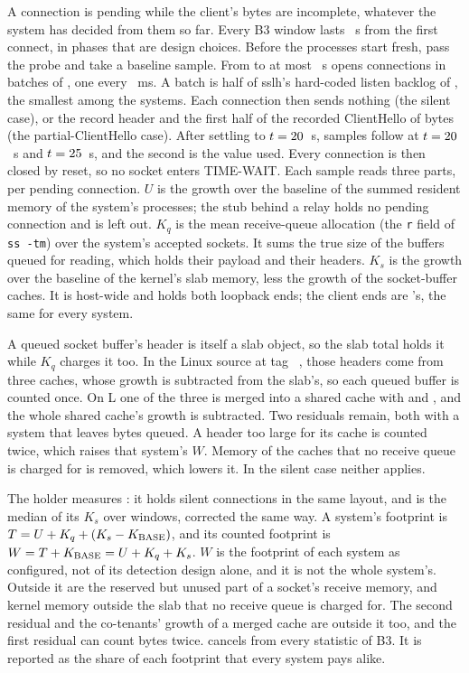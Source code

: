 A connection is pending while the client's bytes are incomplete, whatever the system has decided
from them so far. Every B3 window lasts \PendWindowS{}~s from the first connect, in phases that
are design choices. Before \Tzero{} the processes start fresh, pass the probe and take a baseline
sample. From \Tzero{} to at most \PendOpenS{}~s \opcase{} opens \NPend{} connections in batches
of \PendBatch, one every \PendBatchMs{}~ms. A batch is half of sslh's hard-coded listen backlog of
\SslhBacklog, the smallest among the systems. Each connection then sends nothing (the silent case),
or the record header and the first half of the recorded ClientHello of \HelloLen{} bytes (the
partial-ClientHello case). After settling to $t = 20$~s, samples follow at $t =
20$~s and $t = 25$~s, and the second is the value used. Every connection is then
closed by reset, so no socket enters TIME-WAIT.
Each sample reads three parts, per pending connection. $U$ is the growth over the baseline of the
summed resident memory of the system's processes; the stub behind a relay holds no pending
connection and is left out. $K_q$ is the mean receive-queue allocation (the \texttt{r} field of
\texttt{ss -tm}) over the system's accepted sockets. It sums the true size of the buffers queued
for reading, which holds their payload and their headers. $K_s$ is the growth over the baseline
of the kernel's slab memory, less the growth of the socket-buffer caches. It is host-wide and
holds both loopback ends; the client ends are \opcase's, the same for every system.

A queued socket buffer's header is itself a slab object, so the slab total holds it while $K_q$
charges it too. In the Linux source at tag \KernelTag~\cite{linux2026v72}, those headers come from
three caches, whose growth is subtracted from the slab's, so each queued buffer is counted once. On
L one of the three is merged into a shared cache with  and \SgPool, and the
whole shared cache's growth is subtracted. Two residuals remain, both with a system that leaves
bytes queued. A header too large for its cache is counted twice, which raises that system's $W$.
Memory of the caches that no receive queue is charged for is removed, which lowers it. In the
silent case neither applies.

The holder \ophold{} measures \Kbase: it holds \NPend{} silent connections in the same layout, and
\Kbase{} is the median of its $K_s$ over \KBaseWindows{} windows, corrected the same way. A
system's footprint is $T = U + K_q + (K_s - K_{\mathrm{BASE}})$, and its counted footprint is $W = T + K_{\mathrm{BASE}}
= U + K_q + K_s$. $W$ is the footprint of each system as configured, not of its detection design
alone, and it is not the whole system's. Outside it are the reserved but unused part of a socket's
receive memory, and kernel memory outside the slab that no receive queue is charged for. The second
residual and the co-tenants' growth of a merged cache are outside it too, and the first residual
can count bytes twice. \Kbase{} cancels from every statistic of B3. It is reported as the share of each footprint
that every system pays alike.

